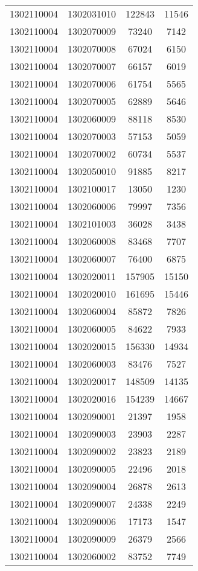\begin{longtable}{llcc}
1302110004 & 1302031010 & 122843 & 11546\\
1302110004 & 1302070009 & 73240 & 7142\\
1302110004 & 1302070008 & 67024 & 6150\\
1302110004 & 1302070007 & 66157 & 6019\\
1302110004 & 1302070006 & 61754 & 5565\\
1302110004 & 1302070005 & 62889 & 5646\\
1302110004 & 1302060009 & 88118 & 8530\\
1302110004 & 1302070003 & 57153 & 5059\\
1302110004 & 1302070002 & 60734 & 5537\\
1302110004 & 1302050010 & 91885 & 8217\\
1302110004 & 1302100017 & 13050 & 1230\\
1302110004 & 1302060006 & 79997 & 7356\\
1302110004 & 1302101003 & 36028 & 3438\\
1302110004 & 1302060008 & 83468 & 7707\\
1302110004 & 1302060007 & 76400 & 6875\\
1302110004 & 1302020011 & 157905 & 15150\\
1302110004 & 1302020010 & 161695 & 15446\\
1302110004 & 1302060004 & 85872 & 7826\\
1302110004 & 1302060005 & 84622 & 7933\\
1302110004 & 1302020015 & 156330 & 14934\\
1302110004 & 1302060003 & 83476 & 7527\\
1302110004 & 1302020017 & 148509 & 14135\\
1302110004 & 1302020016 & 154239 & 14667\\
1302110004 & 1302090001 & 21397 & 1958\\
1302110004 & 1302090003 & 23903 & 2287\\
1302110004 & 1302090002 & 23823 & 2189\\
1302110004 & 1302090005 & 22496 & 2018\\
1302110004 & 1302090004 & 26878 & 2613\\
1302110004 & 1302090007 & 24338 & 2249\\
1302110004 & 1302090006 & 17173 & 1547\\
1302110004 & 1302090009 & 26379 & 2566\\
1302110004 & 1302060002 & 83752 & 7749\\

\end{longtable}
